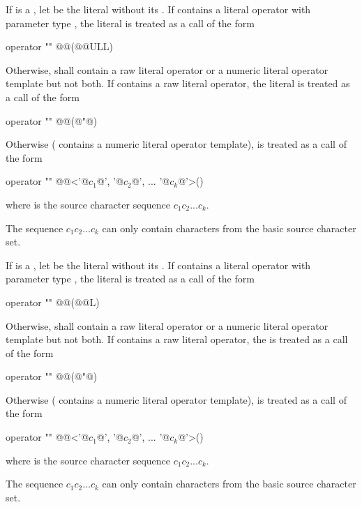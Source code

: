\documentclass{wg21}
\begin{document}
\pnum
If  is a , let  be the literal
without its . If  contains a literal operator with
parameter type , the literal  is treated as a call of
the form
\begin{codeblock}
    operator "" @@(@@ULL)
\end{codeblock}
Otherwise,  shall contain a raw literal operator
or a numeric literal operator template but not both.
If  contains a raw literal operator,
the literal  is treated as a call of the form
\begin{codeblock}
    operator "" @@(@"@)
\end{codeblock}
Otherwise ( contains a numeric literal operator template),
 is treated as a call of the form
\begin{codeblock}
    operator "" @@<'@$c_1$@', '@$c_2$@', ... '@$c_k$@'>()
\end{codeblock}
where  is the source character sequence $c_1c_2...c_k$.
\begin{note}
    The sequence
    $c_1c_2...c_k$ can only contain characters from the basic source character set.
\end{note}

\pnum
If  is a , let  be the
literal without its . If  contains a literal operator
with parameter type , the literal  is treated as a call of
the form
\begin{codeblock}
    operator "" @@(@@L)
\end{codeblock}
Otherwise,  shall contain a raw literal operator
or a numeric literal operator template but not both.
If  contains a raw literal operator,
the   is treated as a call of the form
\begin{codeblock}
    operator "" @@(@"@)
\end{codeblock}
Otherwise ( contains a numeric literal operator template),
 is treated as a call of the form
\begin{codeblock}
    operator "" @@<'@$c_1$@', '@$c_2$@', ... '@$c_k$@'>()
\end{codeblock}
where  is the source character sequence $c_1c_2...c_k$.
\begin{note}
    The sequence
    $c_1c_2...c_k$ can only contain characters from the basic source character set.
\end{note}
\end{document}
